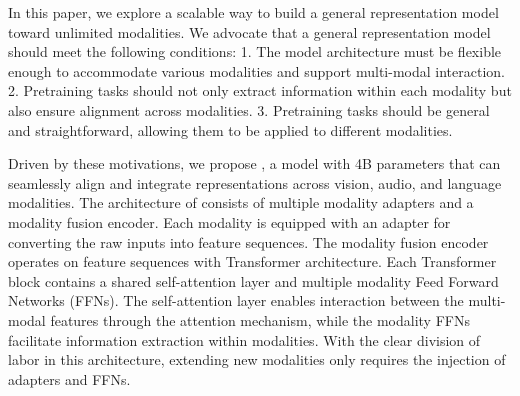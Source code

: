 In this paper, we explore a scalable way to build a general representation model toward unlimited modalities.
We advocate that a general representation model should meet the following conditions:
1. The model architecture must be flexible enough to accommodate various modalities and support multi-modal interaction. 
2. Pretraining tasks should not only extract information within each modality but also ensure alignment across modalities. 
3. Pretraining tasks should be general and straightforward, allowing them to be applied to different modalities.


Driven by these motivations, we propose \onepeace, a model with 4B parameters that can seamlessly align and integrate representations across vision, audio, and language modalities.
The architecture of \onepeace consists of multiple modality adapters and a modality fusion encoder.
Each modality is equipped with an adapter for converting the raw inputs into feature sequences.
The modality fusion encoder operates on feature sequences with Transformer architecture. Each Transformer block contains a shared self-attention layer and multiple modality Feed Forward Networks (FFNs).
The self-attention layer enables interaction between the multi-modal features through the attention mechanism, while the modality FFNs facilitate information extraction within modalities.
With the clear division of labor in this architecture, extending new modalities only requires the injection of adapters and FFNs.

